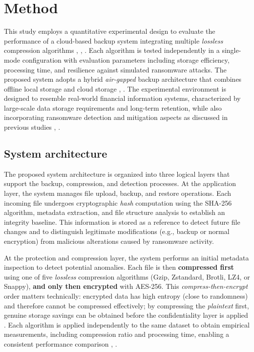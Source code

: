 \documentclass{iaesarticle}
\begin{document}
\section{Method}
\label{sec:method}
This study employs a quantitative experimental design to evaluate the performance of a cloud-based backup system integrating multiple \textit{lossless} compression algorithms \cite{22}, \cite{24}, \cite{25}. Each algorithm is tested independently in a single-mode configuration with evaluation parameters including storage efficiency, processing time, and resilience against simulated ransomware attacks. The proposed system adopts a hybrid \textit{air-gapped} backup architecture that combines offline local storage and cloud storage \cite{21}, \cite{27}. The experimental environment is designed to resemble real-world financial information systems, characterized by large-scale data storage requirements and long-term retention, while also incorporating ransomware detection and mitigation aspects as discussed in previous studies \cite{28}, \cite{29}.

\subsection{System architecture}
The proposed system architecture is organized into three logical layers that support the backup, compression, and detection processes. At the application layer, the system manages file upload, backup, and restore operations. Each incoming file undergoes cryptographic \textit{hash} computation using the SHA-256 algorithm, metadata extraction, and file structure analysis to establish an integrity baseline. This information is stored as a reference to detect future file changes and to distinguish legitimate modifications (e.g., backup or normal encryption) from malicious alterations caused by ransomware activity.

At the protection and compression layer, the system performs an initial metadata inspection to detect potential anomalies. Each file is then \textbf{compressed first} using one of five \textit{lossless} compression algorithms (Gzip, Zstandard, Brotli, LZ4, or Snappy), \textbf{and only then encrypted} with AES-256. This \textit{compress-then-encrypt} order matters technically: encrypted data has high entropy (close to randomness) and therefore cannot be compressed effectively; by compressing the \textit{plaintext} first, genuine storage savings can be obtained before the confidentiality layer is applied \cite{9}. Each algorithm is applied independently to the same dataset to obtain empirical measurements, including compression ratio and processing time, enabling a consistent performance comparison \cite{10}, \cite{36}.
\end{document}
